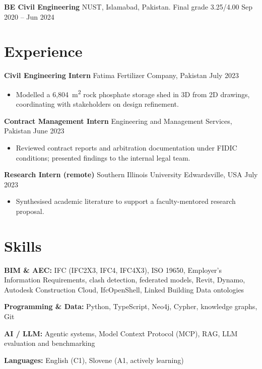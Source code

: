 \documentclass[a4paper,10.5pt]{article}
\newcommand{\datefill}{\dotfill}
\newcommand{\entry}[3]{\vspace{2.5pt}\noindent\textbf{#1} \textbar{} #2 \datefill{} #3\par\vspace{0.5pt}}
\newcommand{\skillrow}[2]{\noindent\textbf{#1:} #2\par\vspace{1pt}}
\begin{document}
\entry{BE Civil Engineering}{NUST, Islamabad, Pakistan. Final grade 3.25/4.00}{Sep 2020 -- Jun 2024}

\section{Experience}
\entry{Civil Engineering Intern}{Fatima Fertilizer Company, Pakistan}{July 2023}
\begin{itemize}
  \item Modelled a 6,804~m\textsuperscript{2} rock phosphate storage shed in 3D from
        2D drawings, coordinating with stakeholders on design refinement.
\end{itemize}

\entry{Contract Management Intern}{Engineering and Management Services, Pakistan}{June 2023}
\begin{itemize}
  \item Reviewed contract reports and arbitration documentation under FIDIC
        conditions; presented findings to the internal legal team.
\end{itemize}

\entry{Research Intern (remote)}{Southern Illinois University Edwardsville, USA}{July 2023}
\begin{itemize}
  \item Synthesised academic literature to support a faculty-mentored research proposal.
\end{itemize}

\section{Skills}

\skillrow{BIM \& AEC}{IFC (IFC2X3, IFC4, IFC4X3), ISO 19650, Employer's Information Requirements, clash detection, federated models, Revit, Dynamo, Autodesk Construction Cloud, IfcOpenShell, Linked Building Data ontologies}
\skillrow{Programming \& Data}{Python, TypeScript, Neo4j, Cypher, knowledge graphs, Git}
\skillrow{AI / LLM}{Agentic systems, Model Context Protocol (MCP), RAG, LLM evaluation and benchmarking}

\skillrow{Languages}{English (C1), Slovene (A1, actively learning)}
\end{document}
